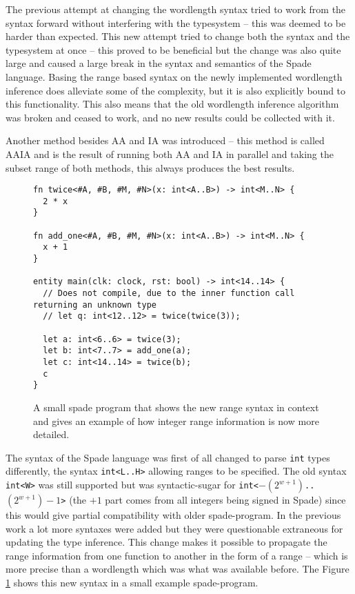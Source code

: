 The previous attempt at changing the wordlength syntax tried to work from the syntax forward without interfering with the typesystem -- this was deemed to be harder than expected. This new attempt tried to change both the syntax and the typesystem at once -- this proved to be beneficial but the change was also quite large and caused a large break in the syntax and semantics of the Spade language. Basing the range based syntax on the newly implemented wordlength inference does alleviate some of the complexity, but it is also explicitly bound to this functionality. This also means that the old wordlength inference algorithm was broken and ceased to work, and no new results could be collected with it.

Another method besides AA and IA was introduced -- this method is called AAIA and is the result of running both AA and IA in parallel and taking the subset range of both methods, this always produces the best results.


\begin{figure}
  \begin{verbatim}
fn twice<#A, #B, #M, #N>(x: int<A..B>) -> int<M..N> {
  2 * x
}

fn add_one<#A, #B, #M, #N>(x: int<A..B>) -> int<M..N> {
  x + 1
}

entity main(clk: clock, rst: bool) -> int<14..14> {
  // Does not compile, due to the inner function call returning an unknown type
  // let q: int<12..12> = twice(twice(3));

  let a: int<6..6> = twice(3);
  let b: int<7..7> = add_one(a);
  let c: int<14..14> = twice(b);
  c
}
  \end{verbatim}
  \caption{A small spade program that shows the new range syntax in context and gives an example of how integer range information is now more detailed.}
  \label{fig:BetterProgram}
\end{figure}

The syntax of the Spade language was first of all changed to parse \verb+int+ types differently, the syntax \verb+int<L..H>+ allowing ranges to be specified. The old syntax \verb+int<W>+ was still supported but was syntactic-sugar for \verb!int<!$-(2^{w+1})$\verb!..!$(2^{w+1})-1$\verb!>! (the $+1$ part comes from all integers being signed in Spade) since this would give partial compatibility with older spade-program. In the previous work a lot more syntaxes were added but they were questionable extraneous for updating the type inference. This change makes it possible to propagate the range information from one function to another in the form of a range -- which is more precise than a wordlength which was what was available before. The Figure \ref{fig:BetterProgram} shows this new syntax in a small example spade-program.

